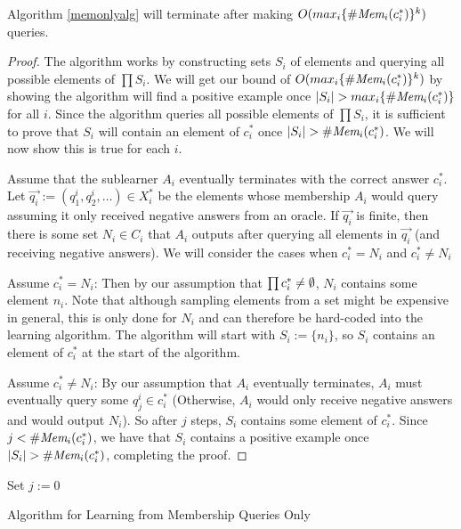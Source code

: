 \begin{proposition}
Algorithm \ref{memonlyalg} will terminate after making $O(max_i \{ \#\emph{Mem}_{i}(c^*_i) \}^k)$ queries.
\end{proposition}
\begin{proof}
The algorithm works by constructing sets $S_i$ of elements and querying all possible elements of $\prod S_i$. 
We will get our bound of $O(max_i \{ \#\emph{Mem}_{i}(c^*_i) \}^k)$ by showing the algorithm will find a positive example once $| S_i | > max_i \{ \#\emph{Mem}_{i}(c^*_i) \}$ for all $i$. 
Since the algorithm queries all possible elements of $\prod S_i$, it is sufficient to prove that $S_i$ will contain an element of $c^*_i$ once $|S_i| > \#\emph{Mem}_{i}(c^*_i)$.
We will now show this is true for each $i$.

Assume that the sublearner $A_i$ eventually terminates with the correct answer $c^*_i$. 
Let $\vec{q_i} := (q_1^i, q_2^i, \dots) \in X_i^*$ be the elements whose membership $A_i$ would query assuming it only received negative answers from an oracle. 
If $\vec{q_i}$ is finite, then there is some set $N_i \in C_i$ that $A_i$ outputs after querying all elements in $\vec{q_i}$ (and receiving negative answers). 
We will consider the cases when $c^*_i = N_i$ and $c^*_i \ne N_i$

Assume $c^*_i = N_i$: Then by our assumption that $\prod c^*_i \ne \emptyset$, $N_i$ contains some element $n_i$. 
Note that although sampling elements from a set might be expensive in general, this is only done for $N_i$ and can therefore be hard-coded into the learning algorithm. 
The algorithm will start with $S_i := \{n_i\}$, so $S_i$ contains an element of $c^*_i$ at the start of the algorithm. 

Assume $c^*_i \ne N_i$: By our assumption that $A_i$ eventually terminates, $A_i$ must eventually query some $q_j^i \in c^*_i$ (Otherwise, $A_i$ would only receive negative answers and would output $N_i$). 
So after $j$ steps, $S_i$ contains some element of $c^*_i$.
Since $j < \#\emph{Mem}_{i}(c^*_i)$, we have that $S_i$ contains a positive example once $| S_i | > \#\emph{Mem}_{i}(c^*_i)$, completing the proof.  
\end{proof}






\begin{algorithm}[H]
\label{memonlyalg}
\SetAlgoLined
Set $j := 0$\;
\caption{Algorithm for Learning from Membership Queries Only}
\end{algorithm}